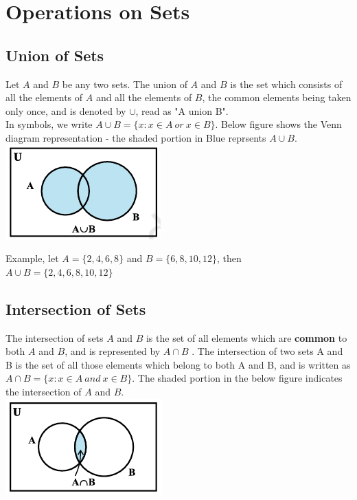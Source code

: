 \documentclass{book}
\begin{document}
		\section{Operations on Sets}
		\subsection{Union of Sets}
		\begin{mdframed}[backgroundcolor=yellow]
			Let $A$  and $B$ be any two sets. The union of  $A$  and $B$ is the set which consists of all the elements of $A$  and all the elements of $B$, the common elements being taken only once, and is denoted by $\cup$, read as "A union B". \\
			In symbols, we write $A \cup B = \{x : x\in A \: or \: x \in B\}$. Below figure shows the Venn diagram representation - the shaded portion in Blue reprsents $A \cup B$.\\
			
			\includegraphics[scale=0.8]{set2}\\
		\end{mdframed}
		Example, let $A = \{2,4,6,8\}$ and $B = \{6,8,10,12\}$, then $A \cup B = \{2,4,6,8,10,12\} $ 
		
		\subsection{Intersection of Sets}
		\begin{mdframed}[backgroundcolor=yellow]
			The intersection of sets $A$ and $B$ is the set of all elements which are \textbf{common} to both $A$ and $B$, and is represented by $A \cap B$ . The intersection of two sets A  and B is the set of all those elements which belong to both A  and B, and is written as $A \cap B = \{ x: x \in A \: and \: x \in B\}$. The shaded portion in the below figure indicates the intersection of $A$  and $B$.\\
			\includegraphics[scale=0.8]{set3}
		\end{mdframed}
	
\end{document}
